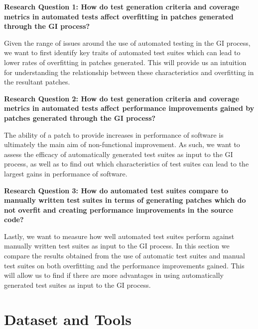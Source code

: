 \documentclass[titlepage]{article}
\begin{document}
\begin{mdframed}
	\textbf{
	Research Question 1: How do test generation criteria and coverage metrics in automated tests 
	affect overfitting in patches generated through the GI process?
	}
\end{mdframed}


Given the range of issues around the use of automated testing in the GI process, we want to first identify key traits of automated test suites which can lead to lower rates of overfitting in patches generated. This will provide us an intuition for understanding the relationship between these characteristics and overfitting in the resultant patches.\\

\begin{mdframed}
	\textbf{
	Research Question 2: How do test generation criteria and coverage metrics in automated tests 			affect performance improvements gained by patches generated through the GI process?
	}
\end{mdframed}

The ability of a patch to provide increases in performance of software is ultimately the main aim of non-functional improvement. As such, we want to assess the efficacy of automatically generated test suites as input to the GI process, as well as to find out which characteristics of test suites can lead to the largest gains in performance of software.\\

\begin{mdframed}
	\textbf{
	Research Question 3: How do automated test suites compare to manually written test suites in 			terms of generating patches which do not overfit and creating performance improvements in the 			source code? 
	}
\end{mdframed}

Lastly, we want to measure how well automated test suites perform against manually written test suites as input to the GI process. In this section we compare the results obtained from the use of automatic test suites and manual test suites on both overfitting and the performance improvements gained.  This will allow us to find if there are more advantages in using automatically generated test suites as input to the GI process. 


\section{Dataset and Tools}
\end{document}
